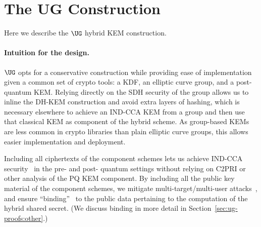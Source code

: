 \section{The UG Construction}\label{sec:ug}

Here we describe the $\UG$ hybrid KEM construction.

\paragraph{Intuition for the design.}
$\UG$ opts for a conservative construction while providing ease of
implementation given a common set of crypto tools: a KDF, an elliptic
curve group, and a post-quantum KEM. Relying directly on the SDH security
of the group allows us to inline the DH-KEM construction and avoid extra
layers of hashing, which is necessary elsewhere to achieve an IND-CCA KEM
from a group and then use that classical KEM as component of the hybrid
scheme. As group-based KEMs are less common in crypto libraries than
plain elliptic curve groups, this allows easier implementation and
deployment.

Including all ciphertexts of the component schemes lets us achieve IND-CCA
security~\cite{PKC:GiaHeuPoe18} in the pre- and post- quantum settings
without relying on C2PRI or other analysis of the PQ KEM component. By
including all the public key material of the component schemes, we mitigate
multi-target/multi-user attacks~\cite{EPRINT:GlaHovSte25}, and ensure
``binding''~\cite{CCS:CreDaxMed24} to the public data pertaining to the
computation of the hybrid shared secret. (We discuss binding in more detail
in Section~\ref{sec:ug-proofs:other}.)
%


